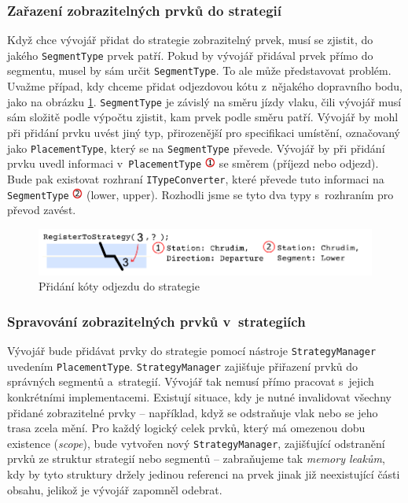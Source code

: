 \subsubsection*{Zařazení zobrazitelných prvků do strategií}
\label{kap4:strategy_placement_type}
Když chce vývojář přidat do strategie zobrazitelný prvek, musí se zjistit, do jakého \texttt{SegmentType} prvek patří. Pokud by vývojář přidával prvek přímo do segmentu, musel by sám určit \texttt{SegmentType}. To ale může představovat problém. Uvažme případ, kdy chceme přidat odjezdovou kótu z~nějakého dopravního bodu, jako na obrázku \ref{fig:view_element_strategy_registration}. \texttt{SegmentType} je závislý na směru jízdy vlaku, čili vývojář musí sám složitě podle výpočtu zjistit, kam prvek podle směru patří. Vývojář by mohl při přidání prvku uvést jiný typ, přirozenější pro specifikaci umístění, označovaný jako \texttt{PlacementType}, který se na \texttt{SegmentType} převede. Vývojář by při přidání prvku uvedl informaci v~\texttt{PlacementType} \includegraphics[height=10.0pt]{../img/cas_osa_typ_1} se směrem (příjezd nebo odjezd). Bude pak existovat rozhraní \texttt{ITypeConverter}, které převede tuto informaci na \texttt{SegmentType} \includegraphics[height=10.0pt]{../img/cas_osa_typ_2} (lower, upper). Rozhodli jsme se tyto dva typy s~rozhraním pro převod zavést.

\begin{figure}[!bth]
	\centering
	\includegraphics[width=\textwidth]{../img/kap3_view_element_segment_registration}
	\caption{Přidání kóty odjezdu do strategie}
	\label{fig:view_element_strategy_registration}
\end{figure}

\subsubsection*{Spravování zobrazitelných prvků v~strategiích}
Vývojář bude přidávat prvky do strategie pomocí nástroje \texttt{StrategyManager} uvedením \texttt{PlacementType}. \texttt{StrategyManager} 
zajišťuje přiřazení prvků do správných segmentů a~strategií. Vývojář tak nemusí přímo pracovat s~jejich konkrétními implementacemi. Existují situace, kdy je nutné invalidovat všechny přidané zobrazitelné prvky -- například, když se odstraňuje vlak nebo se jeho trasa zcela mění. Pro každý logický celek prvků, který má omezenou dobu existence (\textit{scope}), bude vytvořen nový \texttt{StrategyManager}, zajišťující odstranění prvků ze struktur strategií nebo segmentů -- zabraňujeme tak \textit{memory leakům}, kdy by tyto struktury držely jedinou referenci na prvek jinak již neexistující části obsahu, jelikož je vývojář zapomněl odebrat.

